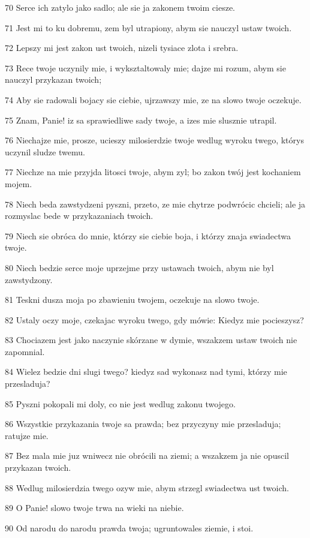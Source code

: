 \par 70 Serce ich zatylo jako sadlo; ale sie ja zakonem twoim ciesze.
\par 71 Jest mi to ku dobremu, zem byl utrapiony, abym sie nauczyl ustaw twoich.
\par 72 Lepszy mi jest zakon ust twoich, nizeli tysiace zlota i srebra.
\par 73 Rece twoje uczynily mie, i wyksztaltowaly mie; dajze mi rozum, abym sie nauczyl przykazan twoich;
\par 74 Aby sie radowali bojacy sie ciebie, ujrzawszy mie, ze na slowo twoje oczekuje.
\par 75 Znam, Panie! iz sa sprawiedliwe sady twoje, a izes mie slusznie utrapil.
\par 76 Niechajze mie, prosze, ucieszy milosierdzie twoje wedlug wyroku twego, którys uczynil sludze twemu.
\par 77 Niechze na mie przyjda litosci twoje, abym zyl; bo zakon twój jest kochaniem mojem.
\par 78 Niech beda zawstydzeni pyszni, przeto, ze mie chytrze podwrócic chcieli; ale ja rozmyslac bede w przykazaniach twoich.
\par 79 Niech sie obróca do mnie, którzy sie ciebie boja, i którzy znaja swiadectwa twoje.
\par 80 Niech bedzie serce moje uprzejme przy ustawach twoich, abym nie byl zawstydzony.
\par 81 Teskni dusza moja po zbawieniu twojem, oczekuje na slowo twoje.
\par 82 Ustaly oczy moje, czekajac wyroku twego, gdy mówie: Kiedyz mie pocieszysz?
\par 83 Chociazem jest jako naczynie skórzane w dymie, wszakzem ustaw twoich nie zapomnial.
\par 84 Wielez bedzie dni slugi twego? kiedyz sad wykonasz nad tymi, którzy mie przesladuja?
\par 85 Pyszni pokopali mi doly, co nie jest wedlug zakonu twojego.
\par 86 Wszystkie przykazania twoje sa prawda; bez przyczyny mie przesladuja; ratujze mie.
\par 87 Bez mala mie juz wniwecz nie obrócili na ziemi; a wszakzem ja nie opuscil przykazan twoich.
\par 88 Wedlug milosierdzia twego ozyw mie, abym strzegl swiadectwa ust twoich.
\par 89 O Panie! slowo twoje trwa na wieki na niebie.
\par 90 Od narodu do narodu prawda twoja; ugruntowales ziemie, i stoi.
